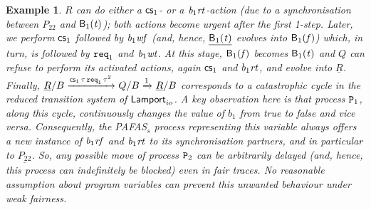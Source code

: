 \documentclass[copyright,creativecommons]{eptcs}
\newtheorem{example}[theorem]{Example}
\newcommand{\nar}[2]{\xrightarrow{#1}_{#2}}
\newcommand{\fa}{\mathit{f}}
\newcommand{\tr}{\mathit{t}}
\newcommand{\Bv}{{\sf B}}
\newcommand{\rtb}[1]{{\it b_{{\rm #1}}rt}}
\newcommand{\rfb}[1]{{\it b_{{\rm #1}}rf}}
\newcommand{\wtb}[1]{{\it b_{{\rm #1}}wt}}
\newcommand{\wfb}[1]{{\it b_{{\rm #1}}wf}}
\newcommand{\req}{{\tt req}}
\newcommand{\cs}{{\sf cs}}
\newcommand{\lamporta}{{\sf Lamport}} \newcommand{\lamportb}{\lamporta}
\newcommand{\proc}{{\tt P}}
\begin{document}
\begin{example}
\noindent $R$ can do either a $\cs_1$- or a $\rtb{1}$-action (due to
a synchronisation between $P_{22}$ and $\Bv_1(\tr)$); both actions become
urgent after the first 1-step. Later, we perform  $\cs_1$ followed by
$\wfb{1}$ (and, hence, $\underline{\Bv_1(\tr)}$ evolves into $\Bv_1(\fa)$)
which, in turn, is followed by $\req_1$ and $\wtb{1}$. At this stage,
$\Bv_1(\fa)$ becomes $\Bv_1(\tr)$ and $Q$ can refuse to perform its
activated actions, again $\cs_1$ and $\rtb{1}$, and evolve into
$\underline{R}$.  Finally, $\underline{R}/B \nar{ \cs_1 \, \tau \, \req_1
\, \tau^2}{} Q/B \nar{1}{} \underline{R}/B$ corresponds to a catastrophic
cycle in the reduced transition system of $\lamporta_{io}$.
A key observation here is that process $\proc_1$, along this cycle,
continuously changes the value of $b_1$ from {\em true} to {\em false} and
vice versa. Consequently, the PAFAS$_s$ process representing this
variable always offers a new instance of $\rfb{1}$ and $\rtb{1}$ to its
synchronisation partners, and in particular to $\underline{P_{22}}$. So,
any possible move of process $\proc_2$ can be arbitrarily delayed (and,
hence, this process can indefinitely be blocked) even in fair traces. No
reasonable assumption about program variables can prevent this unwanted
behaviour under weak fairness.
\end{example}

\vspace{-0.5cm}
\end{document}
